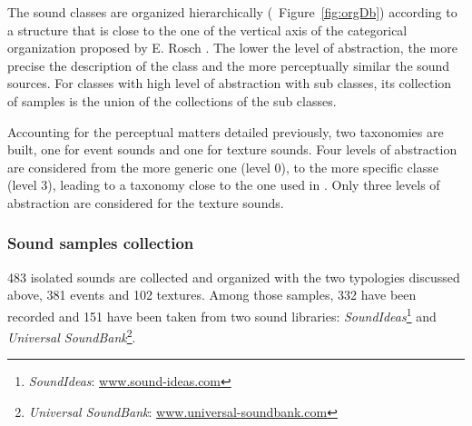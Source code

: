 \documentclass[twoside,twocolumn]{article}
\begin{document}
The sound classes are organized hierarchically (\cf~Figure~\ref{fig:orgDb}) according to a structure that is close to the one of the vertical axis of the categorical organization proposed by E. Rosch \cite{rosch1978cognition}. The lower the level of abstraction, the more precise the description of the class and the more perceptually similar the sound sources. For classes with high level of abstraction with sub classes, its collection of samples is the union of the collections of the sub classes.


Accounting for the perceptual matters detailed previously, two taxonomies are built, one for event sounds and one for texture sounds. Four levels of abstraction are considered from the more generic one (level 0), to the more specific classe (level 3), leading to a taxonomy close to the one used in \cite{Salamon14}. Only three levels of abstraction are considered for the texture sounds.

\subsubsection*{Sound samples collection}


483 isolated sounds are collected and organized with the two typologies discussed above, 381 events and 102 textures. Among those samples, 332 have been recorded and 151 have been taken from two sound libraries: \emph{SoundIdeas}\footnote{\emph{SoundIdeas}: \url{www.sound-ideas.com}} and \emph{Universal SoundBank}\footnote{\emph{Universal SoundBank}: \url{www.universal-soundbank.com}}.
\end{document}
